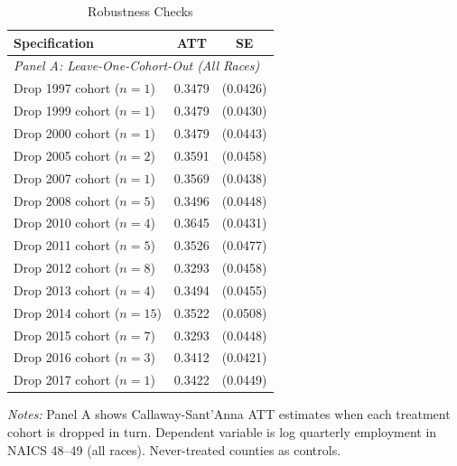 \begin{table}[t]
\centering
\caption{Robustness Checks}
\label{tab:robustness}
\begin{threeparttable}
\begin{tabular}{lcc}
\toprule
Specification & ATT & SE \\
\midrule
\multicolumn{3}{l}{\textit{Panel A: Leave-One-Cohort-Out (All Races)}} \\[3pt]
\quad Drop 1997 cohort ($n = 1$) & 0.3479 & (0.0426) \\
\quad Drop 1999 cohort ($n = 1$) & 0.3479 & (0.0430) \\
\quad Drop 2000 cohort ($n = 1$) & 0.3479 & (0.0443) \\
\quad Drop 2005 cohort ($n = 2$) & 0.3591 & (0.0458) \\
\quad Drop 2007 cohort ($n = 1$) & 0.3569 & (0.0438) \\
\quad Drop 2008 cohort ($n = 5$) & 0.3496 & (0.0448) \\
\quad Drop 2010 cohort ($n = 4$) & 0.3645 & (0.0431) \\
\quad Drop 2011 cohort ($n = 5$) & 0.3526 & (0.0477) \\
\quad Drop 2012 cohort ($n = 8$) & 0.3293 & (0.0458) \\
\quad Drop 2013 cohort ($n = 4$) & 0.3494 & (0.0455) \\
\quad Drop 2014 cohort ($n = 15$) & 0.3522 & (0.0508) \\
\quad Drop 2015 cohort ($n = 7$) & 0.3293 & (0.0448) \\
\quad Drop 2016 cohort ($n = 3$) & 0.3412 & (0.0421) \\
\quad Drop 2017 cohort ($n = 1$) & 0.3422 & (0.0449) \\
\bottomrule
\end{tabular}
\begin{tablenotes}[flushleft]
\small
\item \textit{Notes:} Panel A shows Callaway-Sant'Anna ATT estimates when each treatment cohort is dropped in turn. Dependent variable is log quarterly employment in NAICS 48--49 (all races). Never-treated counties as controls.
\end{tablenotes}
\end{threeparttable}
\end{table}
